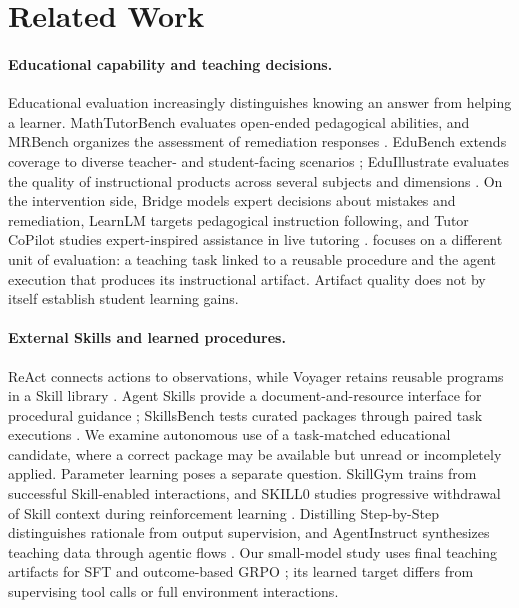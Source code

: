 \section{Related Work}
\label{sec:related}

\paragraph{Educational capability and teaching decisions.}
Educational evaluation increasingly distinguishes knowing an answer from
helping a learner. MathTutorBench evaluates open-ended pedagogical abilities,
and MRBench organizes the assessment of remediation responses
\citep{mathtutorbench,mrbench}. EduBench extends coverage to diverse teacher-
and student-facing scenarios \citep{edubench}; EduIllustrate evaluates the
quality of instructional products across several subjects and dimensions
\citep{eduillustrate}. On the intervention side, Bridge models expert decisions
about mistakes and remediation, LearnLM targets pedagogical instruction
following, and Tutor CoPilot studies expert-inspired assistance in live
tutoring \citep{bridge,learnlm,tutorcopilot}. \bench{} focuses on a different
unit of evaluation: a teaching task linked to a reusable procedure and the
agent execution that produces its instructional artifact. Artifact quality
does not by itself establish student learning gains.

\paragraph{External Skills and learned procedures.}
ReAct connects actions to observations, while Voyager retains reusable
programs in a Skill library \citep{yao2023react,wang2024voyager}. Agent Skills
provide a document-and-resource interface for procedural guidance
\citep{agentskills}; SkillsBench tests curated packages through paired task
executions \citep{skillsbench}. We examine autonomous use of a task-matched
educational candidate, where a correct package may be available but unread or
incompletely applied. Parameter learning poses a separate question.
SkillGym trains from successful Skill-enabled interactions, and SKILL0 studies
progressive withdrawal of Skill context during reinforcement learning
\citep{skillgym,skillzero}. Distilling Step-by-Step distinguishes rationale
from output supervision, and AgentInstruct synthesizes teaching data through
agentic flows \citep{hsieh2023distilling,mitra2024agentinstruct}. Our small-model
study uses final teaching artifacts for SFT and outcome-based GRPO
\citep{deepseekmath}; its learned target differs from supervising tool calls
or full environment interactions.

